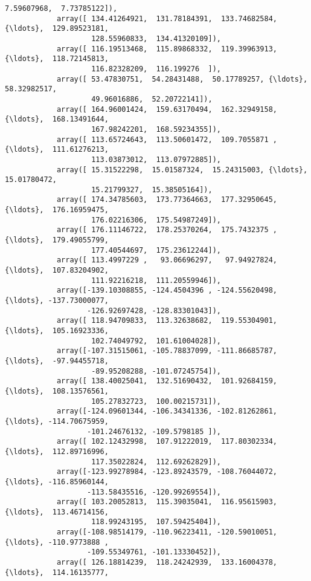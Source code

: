 \documentclass[11pt]{article}
\begin{document}
\begin{Verbatim}[commandchars=\\\{\}]
                    7.59607968,  7.73785122]),
            array([ 134.41264921,  131.78184391,  133.74682584, {\ldots},  129.89523181,
                    128.55960833,  134.41320109]),
            array([ 116.19513468,  115.89868332,  119.39963913, {\ldots},  118.72145813,
                    116.82328209,  116.199276  ]),
            array([ 53.47830751,  54.28431488,  50.17789257, {\ldots},  58.32982517,
                    49.96016886,  52.20722141]),
            array([ 164.96001424,  159.63170494,  162.32949158, {\ldots},  168.13491644,
                    167.98242201,  168.59234355]),
            array([ 113.65724643,  113.50601472,  109.7055871 , {\ldots},  111.61276213,
                    113.03873012,  113.07972885]),
            array([ 15.31522298,  15.01587324,  15.24315003, {\ldots},  15.01780472,
                    15.21799327,  15.38505164]),
            array([ 174.34785603,  173.77364663,  177.32950645, {\ldots},  176.16959475,
                    176.02216306,  175.54987249]),
            array([ 176.11146722,  178.25370264,  175.7432375 , {\ldots},  179.49055799,
                    177.40544697,  175.23612244]),
            array([ 113.4997229 ,   93.06696297,   97.94927824, {\ldots},  107.83204902,
                    111.92216218,  111.20559946]),
            array([-139.10308855, -124.4504396 , -124.55620498, {\ldots}, -137.73000077,
                   -126.92697428, -128.83301043]),
            array([ 118.94709833,  113.32638682,  119.55304901, {\ldots},  105.16923336,
                    102.74049792,  101.61004028]),
            array([-107.31515061, -105.78837099, -111.86685787, {\ldots},  -97.94455718,
                    -89.95208288, -101.07245754]),
            array([ 138.40025041,  132.51690432,  101.92684159, {\ldots},  108.13576561,
                    105.27832723,  100.00215731]),
            array([-124.09601344, -106.34341336, -102.81262861, {\ldots}, -114.70675959,
                   -101.24676132, -109.5798185 ]),
            array([ 102.12432998,  107.91222019,  117.80302334, {\ldots},  112.89716996,
                    117.35022824,  112.69262829]),
            array([-123.99278984, -123.89243579, -108.76044072, {\ldots}, -116.85960144,
                   -113.58435516, -120.99269554]),
            array([ 103.20052813,  115.39035041,  116.95615903, {\ldots},  113.46714156,
                    118.99243195,  107.59425404]),
            array([-108.98514179, -110.96223411, -120.59010051, {\ldots}, -110.9773888 ,
                   -109.55349761, -101.13330452]),
            array([ 126.18814239,  118.24242939,  133.16004378, {\ldots},  114.16135777,

\end{Verbatim}
\end{document}
